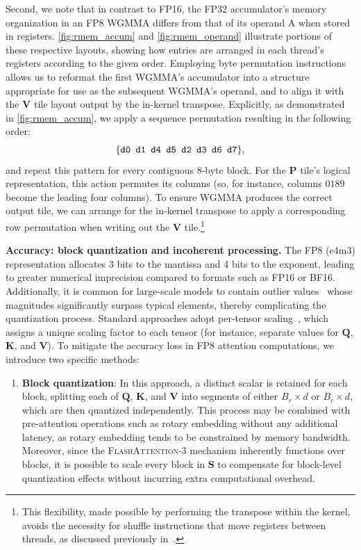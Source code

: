 \begin{algorithm}[H]
\begin{algorithmic}[1]
Second, we note that in contrast to FP16, the FP32 accumulator's memory organization in an FP8 WGMMA differs from that of its operand A when stored in registers. \cref{fig:rmem_accum} and \cref{fig:rmem_operand} illustrate portions of these respective layouts, showing how entries are arranged in each thread’s registers according to the given order. Employing byte permutation instructions allows us to reformat the first WGMMA’s accumulator into a structure appropriate for use as the subsequent WGMMA's operand, and to align it with the $\mathbf{V}$ tile layout output by the in-kernel transpose. Explicitly, as demonstrated in \cref{fig:rmem_accum}, we apply a sequence permutation resulting in the following order:
$$\{ \verb|d0 d1 d4 d5 d2 d3 d6 d7| \},$$
and repeat this pattern for every contiguous 8-byte block. For the $\mathbf{P}$ tile's logical representation, this action permutes its columns (so, for instance, columns $0189$ become the leading four columns). To ensure WGMMA produces the correct output tile, we can arrange for the in-kernel transpose to apply a corresponding row permutation when writing out the $\mathbf{V}$ tile.\footnote{This flexibility, made possible by performing the transpose within the kernel, avoids the necessity for shuffle instructions that move registers between threads, as discussed previously in~\citep{colfax_fp8_flashattention_2024}.}

\textbf{Accuracy: block quantization and incoherent processing.} The FP8 (e4m3) representation allocates 3 bits to the mantissa and 4 bits to the exponent, leading to greater numerical imprecision compared to formats such as FP16 or BF16. Additionally, it is common for large-scale models to contain outlier values~\citep{dettmers2208llm,
  sun2024massive} whose magnitudes significantly surpass typical elements, thereby complicating the quantization process. Standard approaches adopt per-tensor scaling~\citep{micikevicius2022fp8}, which assigns a unique scaling factor to each tensor (for instance, separate values for $\mathbf{Q}$, $\mathbf{K}$, and $\mathbf{V}$).
To mitigate the accuracy loss in FP8 attention computations, we introduce two specific methods:

\begin{enumerate}

\item \textbf{Block quantization}: In this approach, a distinct scalar is retained for each block, splitting each of $\mathbf{Q}$, $\mathbf{K}$, and $\mathbf{V}$ into segments of either $B_r \times d$ or $B_c \times d$, which are then quantized independently. This process may be combined with pre-attention operations such as rotary embedding without any additional latency, as rotary embedding tends to be constrained by memory bandwidth. Moreover, since the \textsc{FlashAttention-3} mechanism inherently functions over blocks, it is possible to scale every block in $\mathbf{S}$ to compensate for block-level quantization effects without incurring extra computational overhead.


\end{enumerate}
\end{algorithmic}
\end{algorithm}
